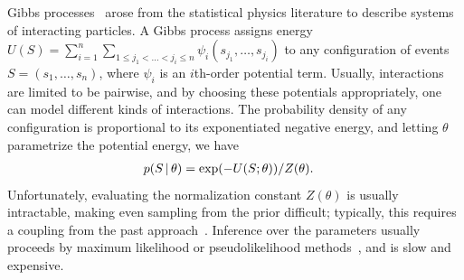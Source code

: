 \documentclass{statsoc}
\begin{document}
{Gibbs processes}~\citep{DalVer2008a} arose from the statistical physics literature to describe 
systems of interacting particles. A Gibbs process assigns energy %
  $U(S) = \sum_{i=1}^n \sum_{1 \le j_1 < \ldots < j_i \le n} \psi_i(s_{j_1},\ldots,s_{j_i})$
to any configuration of events $S = (s_1, \ldots,s_n )$, 
where $\psi_i$ is an $i$th-order potential term.
Usually, interactions are limited to be pairwise, %
and by choosing these potentials appropriately, one can model different kinds of interactions. 
The probability density of any configuration is proportional to its exponentiated
negative energy, and letting $\theta$ parametrize the potential energy, we have
\vspace{-.051in}
\begin{align}
  p(S\,|\,\theta) &= {\exp(-U(S;\theta))}/{Z(\theta)}.
\end{align}
Unfortunately, evaluating the normalization constant $Z(\theta)$ is usually intractable, making
even sampling from the prior difficult; typically, this requires a coupling from the past approach~\citep{Moller2007}. 
Inference over the parameters usually proceeds by maximum likelihood or pseudolikelihood methods~\citep{Moller2007, Mateu2001}, and is slow and expensive.
\end{document}

